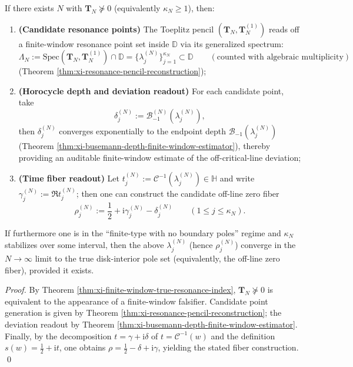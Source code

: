 \begin{theorem}\label{thm:xi-finite-witness-to-offline-fiber}
If there exists \(N\) with \(\mathbf{T}_N\nsucceq 0\) (equivalently \(\kappa_N\ge 1\)), then:
\begin{enumerate}
  \item \textbf{(Candidate resonance points)} The Toeplitz pencil \((\mathbf{T}_N,\mathbf{T}_N^{(1)})\) reads off a finite-window resonance point set inside \(\mathbb{D}\) via its generalized spectrum:
  \[
  \Lambda_N:=\mathrm{Spec}(\mathbf{T}_N,\mathbf{T}_N^{(1)})\cap\mathbb{D}
  =\{\lambda^{(N)}_j\}_{j=1}^{\kappa_N}\subset\mathbb{D}
  \qquad(\text{counted with algebraic multiplicity})
  \]
  (Theorem \ref{thm:xi-resonance-pencil-reconstruction});
  \item \textbf{(Horocycle depth and deviation readout)} For each candidate point, take
  \[
  \delta^{(N)}_j:=\mathcal{B}^{(N)}_{-1}(\lambda^{(N)}_j),
  \]
  then \(\delta^{(N)}_j\) converges exponentially to the endpoint depth \(\mathcal{B}_{-1}(\lambda^{(N)}_j)\) (Theorem \ref{thm:xi-busemann-depth-finite-window-estimator}), thereby providing an auditable finite-window estimate of the off-critical-line deviation;
  \item \textbf{(Time fiber readout)} Let \(t^{(N)}_j:=\mathcal{C}^{-1}(\lambda^{(N)}_j)\in\mathbb{H}\) and write \(\gamma^{(N)}_j:=\Re t^{(N)}_j\); then one can construct the candidate off-line zero fiber
  \[
  \rho^{(N)}_j:=\frac12+\mathrm{i}\gamma^{(N)}_j-\delta^{(N)}_j\qquad(1\le j\le \kappa_N).
  \]
\end{enumerate}
If furthermore one is in the ``finite-type with no boundary poles'' regime and \(\kappa_N\) stabilizes over some interval, then the above \(\lambda^{(N)}_j\) (hence \(\rho^{(N)}_j\)) converge in the \(N\to\infty\) limit to the true disk-interior pole set (equivalently, the off-line zero fiber), provided it exists.
\end{theorem}

\begin{proof}
By Theorem \ref{thm:xi-finite-window-true-resonance-index}, \(\mathbf{T}_N\nsucceq 0\) is equivalent to the appearance of a finite-window falsifier.
Candidate point generation is given by Theorem \ref{thm:xi-resonance-pencil-reconstruction}; the deviation readout by Theorem \ref{thm:xi-busemann-depth-finite-window-estimator}.
Finally, by the decomposition \(t=\gamma+\mathrm{i}\delta\) of \(t=\mathcal{C}^{-1}(w)\) and the definition \(s(w)=\tfrac12+\mathrm{i}t\), one obtains \(\rho=\tfrac12-\delta+\mathrm{i}\gamma\), yielding the stated fiber construction. \qed
\end{proof}

